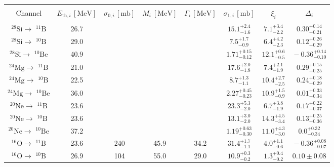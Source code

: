 \documentclass[a4paper,11pt]{article}
\begin{document}
\begin{table}[htp]
\begin{center}
\begin{tabular}{|c|ccccccc|}
\hline
\rowcolor{light-gray}  &   &  &   &  &&&\\[-3mm]
\rowcolor{light-gray}  Channel & $ \!\!E_{\text{th},i}\,[\text{MeV}]\!\!\!$ & $\!\sigma_{0,i}\,[\text{mb}]\!$ & $\!\!M_i\:[\text{MeV}]\!\!$ &  $\!\Gamma_i\,[\text{MeV}]\!$ & $\!\sigma_{1,i}\,[\text{mb}]\!$ & $\xi_i$ &  $\Delta_i$  \\[2mm]
\hline 
  &   & & & & & &\\[-3mm]
 $\!\!^{28}\text{Si}\rightarrow$ $^{11}\text{B}\!$  &26.7   & & && $15.1^{+2.4}_{-1.6}$ & $7.1^{+3.4}_{-2.2}$ & $\!0.30^{+0.14}_{-0.21}$\!\\[2mm]
 $\!\!^{28}\text{Si}\rightarrow$ $^{10}\text{B}\!$  &29.0   & & && $7.5^{+1.7}_{-0.9}$& $6.4^{+4.2}_{-2.3}$& $\!0.12^{+0.26}_{-0.29}$\!\\[2mm]
 $\!\!^{28}\text{Si}\rightarrow$ $^{10}\text{Be}\!$ &40.9   & & & & $1.71^{+0.15}_{-0.12}$& $12.1^{+0.6}_{-0.5}$& $\!-0.36^{+0.14}_{-0.10}$\!\\[2mm]
 $\!\!^{24}\text{Mg}\rightarrow$ $^{11}\text{B}\!$  &21.0   & & & & $17.6^{+2.0}_{-1.8}$ & $7.4^{+2.1}_{-1.9}$ & $\!0.29^{+0.15}_{-0.25}$\!\\[2mm]
 $\!\!^{24}\text{Mg}\rightarrow$ $^{10}\text{B}\!$  &22.5   & & & & $8.7^{+1.3}_{-1.1}$  & $10.4^{+2.7}_{-2.5}$ & $\!0.24^{+0.18}_{-0.29}$\!\\[2mm]
 $\!\!^{24}\text{Mg}\rightarrow$ $^{10}\text{Be}\!$ &36.0   & & & & $2.27^{+0.45}_{-0.23}$ & $10.9^{+1.5}_{-0.9}$& $\!0.01^{+0.33}_{-0.34}$\!\\[2mm]
 $\!\!^{20}\text{Ne}\rightarrow$ $^{11}\text{B}\!$  &23.6   & & & & $23.3^{+5.3}_{-2.0}$ & $6.7^{+3.8}_{-1.9}$ & $\!0.17^{+0.22}_{-0.37}$\!\\[2mm]
 $\!\!^{20}\text{Ne}\rightarrow$ $^{10}\text{B}\!$  &23.6   & & & & $13.1^{+3.0}_{-2.0}$ & $14.3^{+4.5}_{-3.4}$ & $\!0.13^{+0.25}_{-0.36}$ \!\\[2mm]
 $\!\!^{20}\text{Ne}\rightarrow$ $^{10}\text{Be}\!$ &37.2   & & & & $1.19^{+0.63}_{-0.30}$& $11.0^{+4.3}_{-3.0}$& $\!0.0^{+0.32}_{-0.34}$\!\\[2mm]
 $\!\!^{16}\text{O}\rightarrow$ $^{11}\text{B}\!$   &23.6   & 240 & 45.9 & 34.2 & $31.4^{+1.7}_{-1.1}$ & $4.0^{+1.1}_{-0.6}$ & $\!-0.36^{+0.08}_{-0.07}$\!\\[2mm]
 $\!\!^{16}\text{O}\rightarrow$ $^{10}\text{B}\!$  & 26.9   & 104 & 55.0 & 29.0 & $10.9^{+0.3}_{-0.2}$& $1.3^{+0.4}_{-0.2}$ & $\!0.10\pm 0.08$\!\\[2mm]

\end{tabular}
\end{center}
\end{table}
\end{document}
